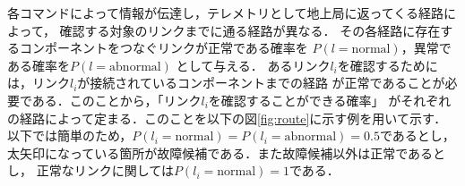 \documentclass[11pt]{jsreport}
\begin{document}
各コマンドによって情報が伝達し，テレメトリとして地上局に返ってくる経路によって，
確認する対象のリンクまでに通る経路が異なる．
その各経路に存在するコンポーネントをつなぐリンクが正常である確率を
$P(l = \text{normal})$，異常である確率を$P(l = \text{abnormal})$ %
として与える．
あるリンク$l_i$を確認するためには，リンク$l_i$が接続されているコンポーネントまでの経路
が正常であることが必要である．このことから，「リンク$l_i$を確認することができる確率」
がそれぞれの経路によって定まる．このことを以下の図\ref{fig:route}に示す例を用いて示す．
以下では簡単のため，$P(l_i = \text{normal}) = P(l_i = \text{abnormal}) = 0.5$であるとし，
太矢印になっている箇所が故障候補である．また故障候補以外は正常であるとし，
正常なリンクに関しては$P(l_i = \text{normal}) =1$である．\\
\end{document}
